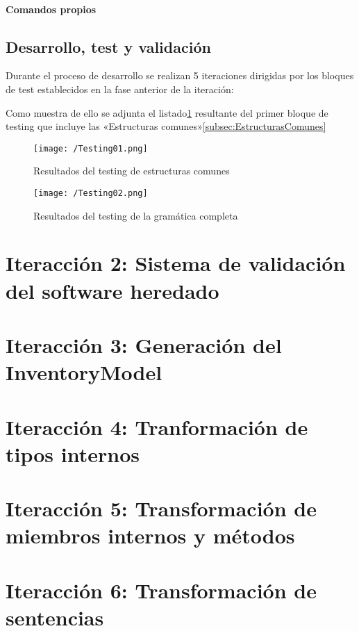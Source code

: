 \paragraph{Comandos propios}

\subsection{Desarrollo, test y validación}

Durante el proceso de desarrollo se realizan 5 iteraciones dirigidas por los bloques de test establecidos en la fase anterior de la iteración:

Como muestra de ello se adjunta el listado\ref{fig:common-structures} resultante del primer bloque de testing que incluye las «Estructuras comunes»\ref{subsec:EstructurasComunes}

\begin{figure}[!h]
\begin{center}
\texttt{[image: /Testing01.png]}
\caption{Resultados del testing de estructuras comunes}
\label{fig:common-structures}
\end{center}
\end{figure}

\begin{figure}[!h]
\begin{center}
\texttt{[image: /Testing02.png]}
\caption{Resultados del testing de la gramática completa}
\label{fig:full-grammar-test}
\end{center}
\end{figure}

\section{Iteracción 2: Sistema de validación del software heredado}
\section{Iteracción 3: Generación del InventoryModel}
\section{Iteracción 4: Tranformación de tipos internos}
\section{Iteracción 5: Transformación de miembros internos y métodos}
\section{Iteracción 6: Transformación de sentencias}